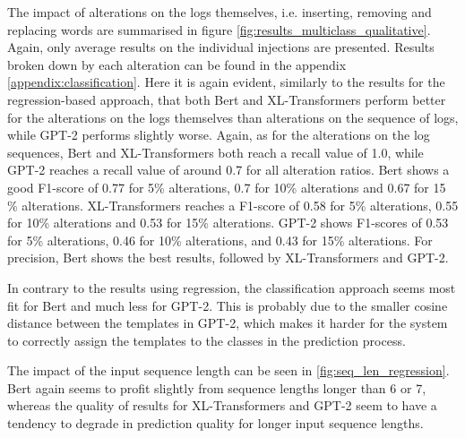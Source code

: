 The impact of alterations on the logs themselves, i.e. inserting, removing and replacing words are summarised in figure \ref{fig:results_multiclass_qualitative}. Again, only average results on the individual injections are presented. Results broken down by each alteration can be found in the appendix \ref{appendix:classification}.
Here it is again evident, similarly to the results for the regression-based approach, that both Bert and XL-Transformers perform better for the alterations on the logs themselves than alterations on the sequence of logs, while GPT-2 performs slightly worse. Again, as for the alterations on the log sequences, Bert and XL-Transformers both reach a recall value of 1.0, while GPT-2 reaches a recall value of around 0.7 for all alteration ratios. Bert shows a good F1-score of 0.77 for 5\% alterations, 0.7 for 10\% alterations and 0.67 for 15 \% alterations. XL-Transformers reaches a F1-score of 0.58 for 5\% alterations, 0.55 for 10\% alterations and 0.53 for 15\% alterations. GPT-2 shows F1-scores of 0.53 for 5\% alterations, 0.46 for 10\% alterations, and 0.43 for 15\% alterations. For precision, Bert shows the best results, followed by XL-Transformers and GPT-2.

In contrary to the results using regression, the classification approach seems most fit for Bert and much less for GPT-2. This is probably due to the smaller cosine distance between the templates in GPT-2, which makes it harder for the system to correctly assign the templates to the classes in the prediction process.

The impact of the input sequence length can be seen in \ref{fig:seq_len_regression}. Bert again seems to profit slightly from sequence lengths longer than 6 or 7, whereas the quality of results for XL-Transformers and GPT-2 seem to have a tendency to degrade in prediction quality for longer input sequence lengths.


